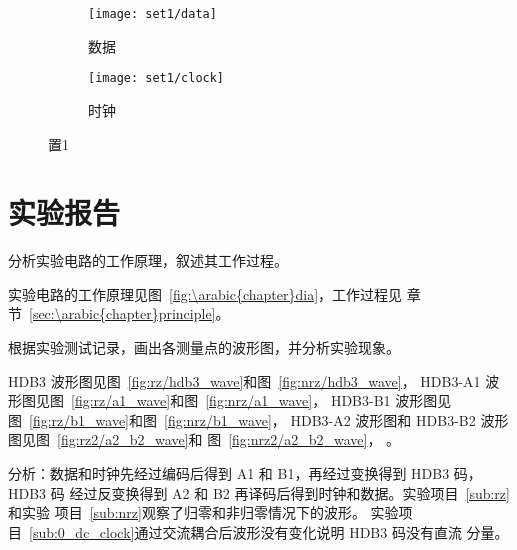 \documentclass[../main]{subfiles}
\begin{document}
\begin{figure}[htbp]
  \centering
  \begin{subfigure}[htbp]{0.45\linewidth}
    \centering
    \texttt{[image: set1/data]}
    \caption{数据}%
    \label{fig:set1/data}
  \end{subfigure}
  \quad
  \begin{subfigure}[htbp]{0.45\linewidth}
    \centering
    \texttt{[image: set1/clock]}
    \caption{时钟}%
    \label{fig:set1/clock}
  \end{subfigure}
  \caption{置1}%
  \label{fig:set1}
\end{figure}

\section{实验报告}%
\label{sec:\arabic{chapter}report}

\begin{Exercise}
  分析实验电路的工作原理，叙述其工作过程。
\end{Exercise}

\begin{Answer}
  实验电路的工作原理见图~\ref{fig:\arabic{chapter}dia}，工作过程见
  章节~\ref{sec:\arabic{chapter}principle}。
\end{Answer}

\begin{Exercise}
  根据实验测试记录，画出各测量点的波形图，并分析实验现象。
\end{Exercise}

\begin{Answer}
  HDB3 波形图见图~\ref{fig:rz/hdb3_wave}和图~\ref{fig:nrz/hdb3_wave}，
  HDB3-A1 波形图见图~\ref{fig:rz/a1_wave}和图~\ref{fig:nrz/a1_wave}，
  HDB3-B1 波形图见图~\ref{fig:rz/b1_wave}和图~\ref{fig:nrz/b1_wave}，
  HDB3-A2 波形图和 HDB3-B2 波形图见图~\ref{fig:rz2/a2_b2_wave}和
  图~\ref{fig:nrz2/a2_b2_wave}， 。

  分析：数据和时钟先经过编码后得到 A1 和 B1，再经过变换得到 HDB3 码，HDB3 码
  经过反变换得到 A2 和 B2 再译码后得到时钟和数据。实验项目~\ref{sub:rz}和实验
  项目~\ref{sub:nrz}观察了归零和非归零情况下的波形。
  实验项目~\ref{sub:0_dc_clock}通过交流耦合后波形没有变化说明 HDB3 码没有直流
  分量。
\end{Answer}
\end{document}

